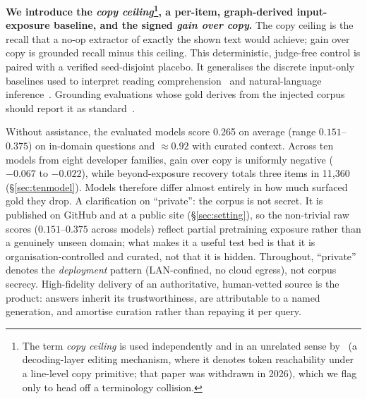 \documentclass[10pt,twocolumn]{article}
\begin{document}
\textbf{We introduce the \emph{copy ceiling}\footnote{The term \emph{copy ceiling} is used independently and in an unrelated sense by~\textcite{copyasdecode2026} (a decoding-layer editing mechanism, where it denotes token reachability under a line-level copy primitive; that paper was withdrawn in 2026), which we flag only to head off a terminology collision.}, a per-item, graph-derived input-exposure baseline, and the signed \emph{gain over copy}.} The copy ceiling is the recall that a no-op extractor of exactly the shown text would achieve; gain over copy is grounded recall minus this ceiling. This deterministic, judge-free control is paired with a verified seed-disjoint placebo. It generalises the discrete input-only baselines used to interpret reading comprehension~\cite{kaushik2018reading} and natural-language inference~\cite{gururangan2018artifacts,poliak2018hypothesis}. Grounding evaluations whose gold derives from the injected corpus should report it as standard~\cite{laitenberger2025stronger,min2023factscore}.

Without assistance, the evaluated models score 0.265 on average (range $0.151$--$0.375$) on in-domain questions and $\approx0.92$ with curated context. Across ten models from eight developer families, gain over copy is uniformly negative ($-0.067$ to $-0.022$), while beyond-exposure recovery totals three items in 11{,}360 (\S\ref{sec:tenmodel}). Models therefore differ almost entirely in how much surfaced gold they drop. A clarification on ``private'': the corpus is not secret. It is published on GitHub and at a public site (\S\ref{sec:setting}), so the non-trivial raw scores ($0.151$--$0.375$ across models) reflect partial pretraining exposure rather than a genuinely unseen domain; what makes it a useful test bed is that it is organisation-controlled and curated, not that it is hidden. Throughout, ``private'' denotes the \emph{deployment} pattern (LAN-confined, no cloud egress), not corpus secrecy. High-fidelity delivery of an authoritative, human-vetted source is the product: answers inherit its trustworthiness, are attributable to a named generation, and amortise curation rather than repaying it per query.
\end{document}
